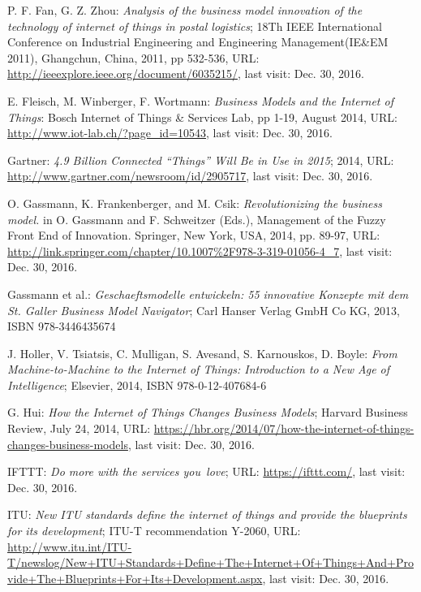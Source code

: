 \begin{thebibliography}{99}
	 P. F. Fan, G. Z. Zhou: \emph{Analysis of the business model innovation of the technology of internet of things in postal logistics}; 18Th IEEE International Conference on Industrial Engineering and Engineering Management(IE\&EM 2011), Ghangchun, China, 2011, pp 532-536, URL: \url{http://ieeexplore.ieee.org/document/6035215/}, last visit: Dec. 30, 2016.

	 E. Fleisch, M. Winberger, F. Wortmann: \emph{Business Models and the Internet of Things}: Bosch Internet of Things \& Services Lab, pp 1-19, August 2014, URL: \url{http://www.iot-lab.ch/?page_id=10543}, last visit: Dec. 30, 2016.

 	 Gartner: \emph{4.9 Billion Connected ``Things'' Will Be in Use in 2015}; 2014, URL: \url{http://www.gartner.com/newsroom/id/2905717}, last visit: Dec. 30, 2016.
	
	 O. Gassmann, K. Frankenberger, and M. Csik: \emph{Revolutionizing the business model.} in O. Gassmann and F. Schweitzer (Eds.), Management of the Fuzzy Front End of Innovation. Springer, New York, USA, 2014, pp. 89-97, URL: \url{http://link.springer.com/chapter/10.1007%2F978-3-319-01056-4_7}, last visit: Dec. 30, 2016.

	 Gassmann et al.: \emph{Geschaeftsmodelle entwickeln: 55 innovative Konzepte mit dem St. Galler Business Model Navigator}; Carl Hanser Verlag GmbH Co KG, 2013, ISBN 978-3446435674
	
	 J. Holler, V. Tsiatsis, C. Mulligan, S. Avesand, S. Karnouskos, D. Boyle: \emph{From Machine-to-Machine to the Internet of Things: Introduction to a New Age of Intelligence}; Elsevier, 2014, ISBN 978-0-12-407684-6
	
	 G. Hui: \emph{How the Internet of Things Changes Business Models}; Harvard Business Review, July 24, 2014, URL: \url{https://hbr.org/2014/07/how-the-internet-of-things-changes-business-models}, last visit: Dec. 30, 2016.

	 IFTTT: \emph{Do more with the services you love}; URL: \url{https://ifttt.com/}, last visit: Dec. 30, 2016.

 	 ITU: \emph{New ITU standards define the internet of things and provide the blueprints for its development}; ITU-T recommendation   Y-2060, URL: \url{http://www.itu.int/ITU-T/newslog/New+ITU+Standards+Define+The+Internet+Of+Things+And+Provide+The+Blueprints+For+Its+Development.aspx}, last visit: Dec. 30, 2016.


\end{thebibliography}
